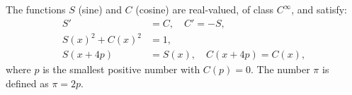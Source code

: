 The functions $S$ (sine) and $C$ (cosine) are real-valued, of class $C^\infty$, and satisfy:
\begin{align}
S' &= C, \quad C' = -S, \\
S(x)^2 + C(x)^2 &= 1, \\
S(x + 4p) &= S(x), \quad C(x + 4p) = C(x),
\end{align}
where $p$ is the smallest positive number with $C(p) = 0$. The number $\pi$ is defined as $\pi = 2p$.
